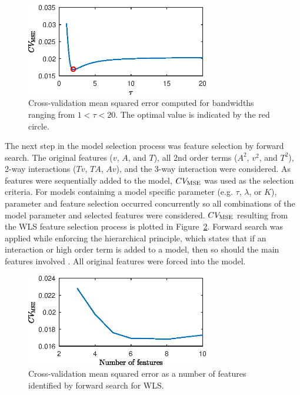 \documentclass[twocolumn,10pt]{article}
\begin{document}
\begin{figure}
\centering
\includegraphics[width=80mm]{bandWidthTesting}
\caption{Cross-validation mean squared error computed for bandwidths ranging from  $1<\tau<20$. The optimal value is indicated by the red circle.}
\label{fig:bandwidth}
\end{figure}

The next step in the model selection process was feature selection by forward search. The original features ($v$, $A$, and $T$), all 2nd order terms ($A^2$, $v^2$, and $T^2$), 2-way interactions ($Tv$, $TA$, $Av$), and the 3-way interaction were considered. As features were sequentially added to the model, $CV_{\hbox{\scriptsize MSE}}$ was used as the selection criteria. For models containing a model specific parameter (e.g. $\tau$, $\lambda$, or $K$), parameter and feature selection occurred concurrently so all combinations of the model parameter and selected features were considered. $CV_{\hbox{\scriptsize MSE}}$ resulting from the WLS feature selection process is plotted in Figure~\ref{fig:CVerror}. Forward search was applied while enforcing the hierarchical principle, which states that if an interaction or high order term is added to a model, then so should the main features involved \cite{friedman2001}. All original features were forced into the model.

\begin{figure}
\centering
 \includegraphics[width=80mm]{featureSelectionWLS}
 \caption{Cross-validation mean squared error as a number of features identified by forward search for WLS.}
\label{fig:CVerror}
 \end{figure}
\end{document}
